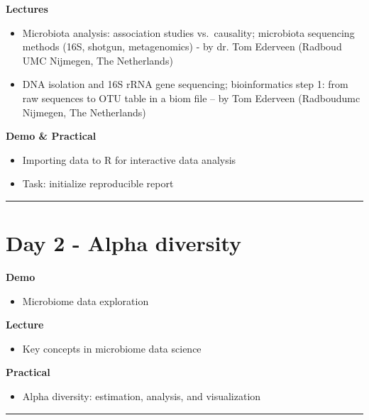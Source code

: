 \documentclass[
  oneside]{book}
\providecommand{\tightlist}{%
  \setlength{\itemsep}{0pt}\setlength{\parskip}{0pt}}
\begin{document}
\textbf{Lectures}

\begin{itemize}
\item
  Microbiota analysis: association studies vs.~causality; microbiota sequencing methods (16S, shotgun, metagenomics) - by dr. Tom Ederveen (Radboud UMC Nijmegen, The Netherlands)
\item
  DNA isolation and 16S rRNA gene sequencing; bioinformatics step 1: from raw sequences to OTU table in a biom file -- by Tom Ederveen (Radboudumc Nijmegen, The Netherlands)
\end{itemize}

\textbf{Demo \& Practical}

\begin{itemize}
\item
  Importing data to R for interactive data analysis
\item
  Task: initialize reproducible report
\end{itemize}

\begin{center}\rule{0.5\linewidth}{0.5pt}\end{center}

\hypertarget{day-2---alpha-diversity}{%
\section{Day 2 - Alpha diversity}\label{day-2---alpha-diversity}}

\textbf{Demo}

\begin{itemize}
\tightlist
\item
  Microbiome data exploration
\end{itemize}

\textbf{Lecture}

\begin{itemize}
\tightlist
\item
  Key concepts in microbiome data science
\end{itemize}

\textbf{Practical}

\begin{itemize}
\tightlist
\item
  Alpha diversity: estimation, analysis, and visualization
\end{itemize}

\begin{center}\rule{0.5\linewidth}{0.5pt}\end{center}
\end{document}
